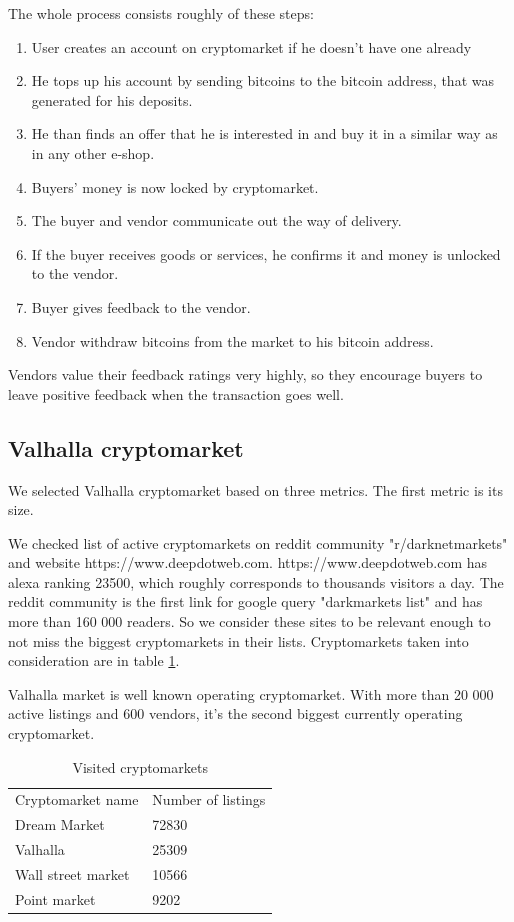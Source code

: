 \documentclass[
  digital, %
  table,   %
  lof,     %
  lot,     %
  oneside
]{fithesis3}
\begin{document}
 The whole process consists roughly of these steps:
\begin{enumerate}
\item User creates an account on cryptomarket if he doesn't have one already
\item He tops up his account by sending bitcoins to the bitcoin address,
that was generated for his deposits.
\item He than finds an offer that he is interested in and buy it in a similar
way as in any other e-shop.
\item Buyers' money is now locked by cryptomarket.
\item The buyer and vendor communicate out the way of delivery.
\item If the buyer receives goods or services, he confirms it and money is unlocked to the vendor.
\item Buyer gives feedback to the vendor. 
\item Vendor withdraw bitcoins from the market to his bitcoin address.
\end{enumerate}

Vendors value their feedback ratings very highly, so they encourage buyers to leave
 positive feedback when the transaction goes well.
 
\subsection{Valhalla cryptomarket}

We selected Valhalla cryptomarket based on three metrics.
The first metric is its size.

We checked list of active cryptomarkets on reddit community "r/darknetmarkets" and website https://www.deepdotweb.com.
https://www.deepdotweb.com has alexa ranking 23500, which roughly corresponds to thousands visitors a day.
The reddit community is the first link for google query "darkmarkets list" and 
has more than 160 000 readers. So we consider these sites to be relevant enough to not miss
the biggest cryptomarkets in their lists. Cryptomarkets taken into consideration are in table \ref{cryptomarkets}.

Valhalla market is well known operating cryptomarket.
With more than 20 000 active listings and 600 vendors, it's the second biggest currently operating cryptomarket.

\begin{table}
    \caption{Visited cryptomarkets}
    \label{cryptomarkets}
    \begin{tabular}{|l|l|}
    Cryptomarket name & Number of listings\\
    Dream Market & 72830 \\
    Valhalla     & 25309 \\
    Wall street market   & 10566 \\
    Point market  & 9202 \\
    \end{tabular}
\end{table}
\end{document}
